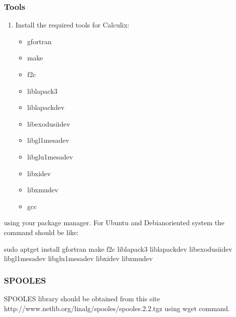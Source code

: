 \documentclass[letterpaper,10pt,english]{sphinxmanual}
\begin{document}
\subsubsection{Tools}
\label{\detokenize{software_setup/calculix:tools}}\begin{enumerate}
%
\item {} 
Install the required tools for Calculix:
\begin{itemize}
\item {} 
gfortran

\item {} 
make

\item {} 
f2c

\item {} 
liblapack3

\item {} 
liblapack\sphinxhyphen{}dev

\item {} 
libexodusii\sphinxhyphen{}dev

\item {} 
libgl1\sphinxhyphen{}mesa\sphinxhyphen{}dev

\item {} 
libglu1\sphinxhyphen{}mesa\sphinxhyphen{}dev

\item {} 
libxi\sphinxhyphen{}dev

\item {} 
libxmu\sphinxhyphen{}dev

\item {} 
gcc

\end{itemize}

\end{enumerate}

using your package manager. For Ubuntu and Debian\sphinxhyphen{}oriented system the command should be like:

\begin{sphinxVerbatim}[commandchars=\\\{\}]
sudo apt\PYGZhy{}get install gfortran make f2c liblapack3 liblapack\PYGZhy{}dev libexodusii\PYGZhy{}dev libgl1\PYGZhy{}mesa\PYGZhy{}dev libglu1\PYGZhy{}mesa\PYGZhy{}dev libxi\PYGZhy{}dev libxmu\PYGZhy{}dev
\end{sphinxVerbatim}


\subsubsection{SPOOLES}
\label{\detokenize{software_setup/calculix:spooles}}
SPOOLES library should be obtained from this site http://www.netlib.org/linalg/spooles/spooles.2.2.tgz using wget command.
\end{document}
